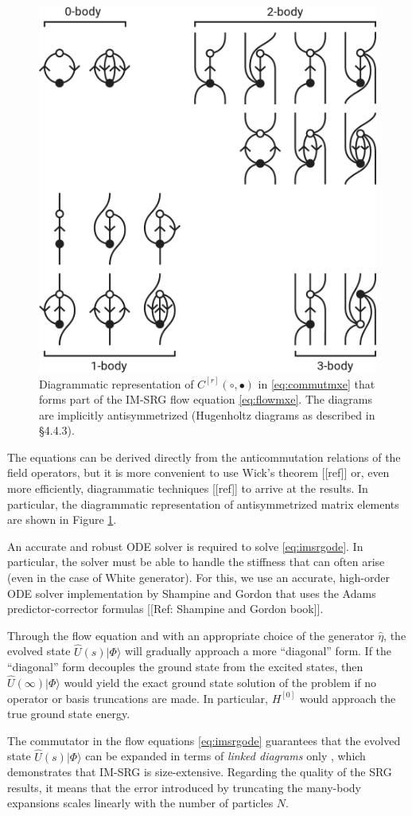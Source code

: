 \documentclass[amsmath, amssymb, aps, floatfix, nofootinbib, preprintnumbers,showpacs, superscriptaddress, twocolumn]{revtex4-1}
\newcommand{\ket}[1]{| #1 \rangle}
\begin{document}
\begin{figure}
\includegraphics[width=.48\textwidth]{fig-diagrams-imsrg}
\caption{Diagrammatic representation of $C^{[r]}(\circ, \bullet)$ in \eqref{eq:commutmxe} that forms part of the IM-SRG flow equation \eqref{eq:flowmxe}.  The diagrams are implicitly antisymmetrized (Hugenholtz diagrams \cite{HUGENHOLTZ1957481} as described in \cite{shavitt2009many} \S 4.4.3).}
\label{fig:diagrams-imsrg}
\end{figure}
The equations can be derived directly from the anticommutation relations of the field operators, but it is more convenient to use Wick's theorem [[ref]] or, even more efficiently, diagrammatic techniques [[ref]] to arrive at the results.  In particular, the diagrammatic representation of antisymmetrized matrix elements are shown in Figure \ref{fig:diagrams-imsrg}.

An accurate and robust ODE solver is required to solve \eqref{eq:imsrgode}.  In particular, the solver must be able to handle the stiffness that can often arise (even in the case of White generator).  For this, we use an accurate, high-order ODE solver implementation by Shampine and Gordon that uses the Adams predictor-corrector formulas [[Ref: Shampine and Gordon book]].

Through the flow equation and with an appropriate choice of the generator $\hat{\eta}$, the evolved state $\hat U(s) \ket{\Phi}$ will gradually approach a more ``diagonal'' form.  If the ``diagonal'' form decouples the ground state from the excited states, then $\hat U(\infty) \ket{\Phi}$ would yield the exact ground state solution of the problem if no operator or basis truncations are made.  In particular, $H^{[0]}$ would approach the true ground state energy.

The commutator in the flow equations \eqref{eq:imsrgode} guarantees that the evolved state $\hat U(s) \ket{\Phi}$ can be expanded in terms of \emph{linked diagrams} only \cite{shavitt2009many,ISI:A1981MN73700014}, which demonstrates that IM-SRG is size-extensive.  Regarding the quality of the SRG results, it means that the error introduced by truncating the many-body expansions scales linearly with the number of particles $N$.
\end{document}
